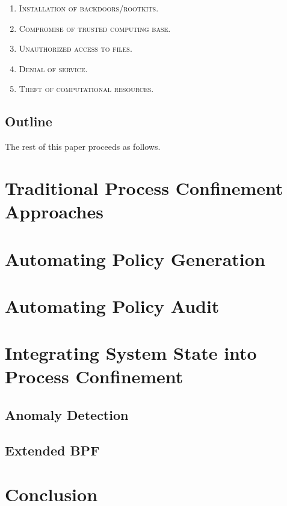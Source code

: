 \documentclass[dvipsnames, 12pt]{article}
\begin{document}
\begin{enumerate}[label=\bfseries A\arabic*.]
    \item \textsc{Installation of backdoors/rootkits.}

    \item \textsc{Compromise of trusted computing base.}

    \item \textsc{Unauthorized access to files.}

    \item \textsc{Denial of service.}

    \item \textsc{Theft of computational resources.}
\end{enumerate}

\subsection{Outline}

The rest of this paper proceeds as follows. 

\section{Traditional Process Confinement Approaches}

\section{Automating Policy Generation}

\section{Automating Policy Audit}

\section{Integrating System State into Process Confinement}

\subsection{Anomaly Detection}

\subsection{Extended BPF}

\section{Conclusion}


\nocite{*} %
\clearpage
\printbibliography
\end{document}
